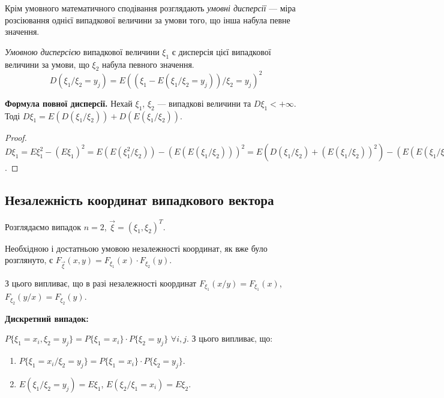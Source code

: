 Крім умовного математичного сподівання розглядають
\emph{умовні дисперсії} --- міра розсіювання однієї випадкової величини 
за умови того, що інша набула певне значення.

\begin{definition}
    \emph{Умовною дисперсією} випадкової величини $\xi_1$ 
    є дисперсія цієї випадкової величини за умови, що 
    $\xi_2$ набула певного значення.
    $$D(\xi_1 / \xi_2 = y_j) = 
    E((\xi_1 - E(\xi_1 / \xi_2 = y_j))/\xi_2 = y_j)^2$$
\end{definition}

\noindent\textbf{Формула повної дисперсії.}
    Нехай $\xi_1$, $\xi_2$ --- випадкові величини та $D\xi_1 < +\infty$. 
    Тоді
    $D\xi_1 = E(D(\xi_1/\xi_2)) + D(E(\xi_1 / \xi_2))$.

\begin{proof}
    $D\xi_1 = E\xi_1^2 - (E \xi_1)^2 = 
    E(E(\xi_1^2 / \xi_2)) - (E(E(\xi_1/\xi_2)))^2 = 
    E(D(\xi_1/\xi_2) + (E(\xi_1/\xi_2))^2) - (E(E(\xi_1/\xi_2)))^2 = 
    E(D(\xi_1 / \xi_2)) + (E(E(\xi_1/\xi_2)^2) - 
    (E(E(\xi_1 / \xi_2)))^2) = E(D(\xi_1/\xi_2)) + D(E(\xi_1/\xi_2))$.
\end{proof}



\subsection{Незалежність координат випадкового вектора}

Розглядаємо випадок $n=2$, $\vec{\xi} = \left(\xi_1, \xi_2\right)^T$.

Необхідною і достатньою умовою незалежності координат, як вже було розглянуто, є 
$F_{\vec{\xi}}(x, y) = F_{\xi_1}(x)\cdot F_{\xi_2}(y)$.

З цього випливає, що в разі незалежності координат $F_{\xi_1}(x/y) = F_{\xi_1}(x)$, 
$F_{\xi_2}(y/x) = F_{\xi_2}(y)$.

\noindent\textbf{Дискретний випадок: }

$P\{\xi_1 = x_i, \xi_2 = y_j\} = P\{\xi_1 = x_i\}\cdot P\{\xi_2 = y_j\}$ 
$\forall i,j$.
З цього випливає, що:

\begin{enumerate}
    \item $P\{\xi_1 = x_i / \xi_2 = y_j\} = 
    P\{\xi_1 = x_i\}\cdot P\{\xi_2 = y_j\}$.
    \item $E(\xi_1 / \xi_2 = y_j) = E\xi_1$,
    $E(\xi_2 / \xi_1 = x_i) = E\xi_2$.
\end{enumerate}

